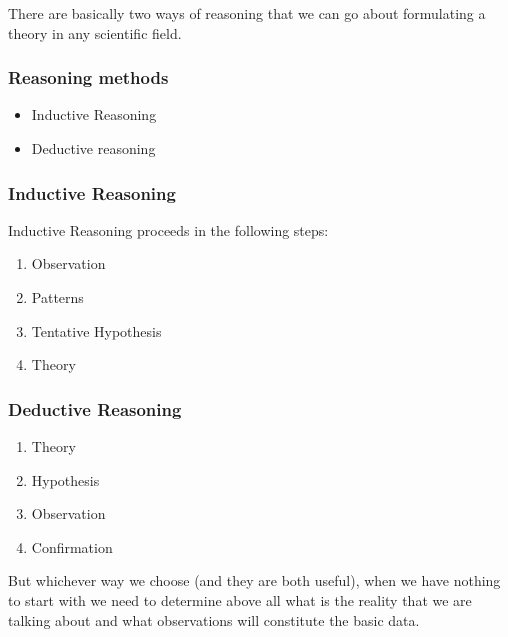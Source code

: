 \begin{frame}
  There are basically two ways of reasoning that we can go about formulating a theory in any scientific field.
\end{frame}

\begin{frame}[fragile]
\frametitle{Reasoning methods}

\begin{center}
\begin{itemize}
\item  Inductive Reasoning 
\item Deductive reasoning
\end{itemize}
\end{center}
  
\end{frame}


\begin{frame}
  \frametitle{Inductive Reasoning}
Inductive Reasoning proceeds in the following steps:
\begin{enumerate}
\item Observation
\item Patterns
\item Tentative Hypothesis
\item Theory
\end{enumerate}
\end{frame}

\begin{frame}
  \frametitle{Deductive Reasoning}
  \begin{enumerate}
  \item Theory
  \item Hypothesis
  \item Observation
  \item Confirmation
  \end{enumerate}
\end{frame}


\begin{frame}
But whichever way we choose (and they are both useful), when we have nothing to start with we need to determine above all what is the reality that we are talking about and what observations will constitute the basic data.
\end{frame}

